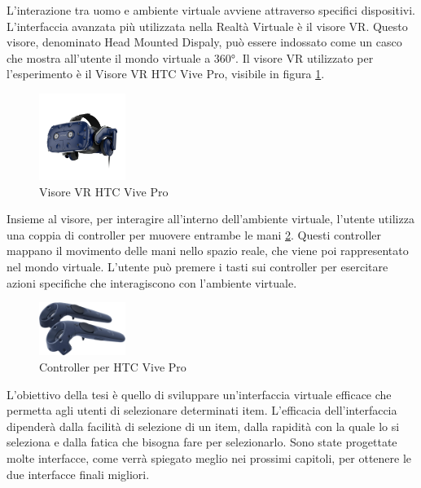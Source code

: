 \documentclass[target=bach,aauheader=]{thud}
\begin{document}
L'interazione tra uomo e ambiente virtuale avviene attraverso specifici dispositivi.
L'interfaccia avanzata più utilizzata nella Realtà Virtuale è il visore VR. 
Questo visore, denominato Head Mounted Dispaly, può essere indossato come un casco che mostra all'utente il mondo virtuale a 360°.
Il visore VR utilizzato per l'esperimento è il Visore VR HTC Vive Pro, visibile in figura \ref{fig:vive_pro}.

\begin{figure}[h]
    \centering
    \includegraphics[width=0.25\textwidth]{vive_pro}
    \caption{Visore VR HTC Vive Pro}
    \label{fig:vive_pro}
\end{figure}

Insieme al visore, per interagire all'interno dell'ambiente virtuale, l'utente utilizza una coppia di controller per muovere entrambe le mani \ref{fig:vive_contr}.
Questi controller mappano il movimento delle mani nello spazio reale, che viene poi rappresentato nel mondo virtuale. 
L'utente può premere i tasti sui controller per esercitare azioni specifiche che interagiscono con l'ambiente virtuale. \\

\begin{figure}[h]
    \centering
    \includegraphics[width=0.25\textwidth]{vive_contr}
    \caption{Controller per HTC Vive Pro}
    \label{fig:vive_contr}
\end{figure}

\newpage
L'obiettivo della tesi è quello di sviluppare un'interfaccia virtuale efficace che permetta agli utenti di selezionare determinati item.
L'efficacia dell'interfaccia dipenderà dalla facilità di selezione di un item, dalla rapidità con la quale lo si seleziona e dalla fatica che bisogna fare per selezionarlo.
Sono state progettate molte interfacce, come verrà spiegato meglio nei prossimi capitoli, per ottenere le due interfacce finali migliori. \\
\end{document}
